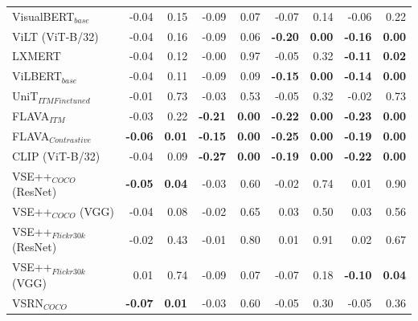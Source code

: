 \begin{table}[ht]
\begin{adjustbox}{max width=\textwidth}
\begin{tabular}{l|rr|rrrrrr}
 VisualBERT$_{base}$          & -0.04          & 0.15          & -0.09          & 0.07          & -0.07          & 0.14          & -0.06          & 0.22          \\
 ViLT (ViT-B/32)              & -0.04          & 0.16          & -0.09          & 0.06          & \textbf{-0.20} & \textbf{0.00} & \textbf{-0.16} & \textbf{0.00} \\
 LXMERT                       & -0.04          & 0.12          & -0.00          & 0.97          & -0.05          & 0.32          & \textbf{-0.11} & \textbf{0.02} \\
 ViLBERT$_{base}$             & -0.04          & 0.11          & -0.09          & 0.09          & \textbf{-0.15} & \textbf{0.00} & \textbf{-0.14} & \textbf{0.00} \\
 UniT$_{ITM Finetuned}$       & -0.01          & 0.73          & -0.03          & 0.53          & -0.05          & 0.32          & -0.02          & 0.73          \\
 FLAVA$_{ITM}$                & -0.03          & 0.22          & \textbf{-0.21} & \textbf{0.00} & \textbf{-0.22} & \textbf{0.00} & \textbf{-0.23} & \textbf{0.00} \\
 FLAVA$_{Contrastive}$        & \textbf{-0.06} & \textbf{0.01} & \textbf{-0.15} & \textbf{0.00} & \textbf{-0.25} & \textbf{0.00} & \textbf{-0.19} & \textbf{0.00} \\
 CLIP (ViT-B/32)              & -0.04          & 0.09          & \textbf{-0.27} & \textbf{0.00} & \textbf{-0.19} & \textbf{0.00} & \textbf{-0.22} & \textbf{0.00} \\
 VSE++$_{COCO}$ (ResNet)      & \textbf{-0.05} & \textbf{0.04} & -0.03          & 0.60          & -0.02          & 0.74          & 0.01           & 0.90          \\
 VSE++$_{COCO}$ (VGG)         & -0.04          & 0.08          & -0.02          & 0.65          & 0.03           & 0.50          & 0.03           & 0.56          \\
 VSE++$_{Flickr30k}$ (ResNet) & -0.02          & 0.43          & -0.01          & 0.80          & 0.01           & 0.91          & 0.02           & 0.67          \\
 VSE++$_{Flickr30k}$ (VGG)    & 0.01           & 0.74          & -0.09          & 0.07          & -0.07          & 0.18          & \textbf{-0.10} & \textbf{0.04} \\
 VSRN$_{COCO}$                & \textbf{-0.07} & \textbf{0.01} & -0.03          & 0.60          & -0.05          & 0.30          & -0.05          & 0.36          \\

\end{tabular}
\end{adjustbox}
\end{table}
